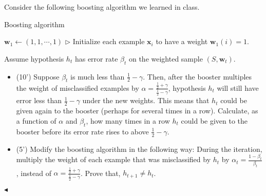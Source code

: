 \documentclass[11pt]{article}
\newenvironment{problem}[2][Problem]{\begin{trivlist}
\item[\hskip \labelsep {\bfseries #1}\hskip \labelsep {\bfseries #2.}]}{\hfill$\blacktriangleleft$\end{trivlist}}
\begin{document}
\begin{problem}{2 (15')} 
Consider the following boosting algorithm we learned in class. 

\begin{algorithm}[H]
    \caption{Boosting algorithm}

    $\bm w_1\gets (1,1,\cdots,1)$ \hfill{$\triangleright$ Initialize each example $\bm x_i$ to have a weight $\bm w_{1}(i)=1$.}


\end{algorithm}

Assume hypothesis $h_t$ has error rate $\beta_t$ on the weighted sample $(S,\bm w_t)$.
\begin{itemize}
    \item [(1)] (10') Suppose $\beta_t$ is much less than $\frac12-\gamma$. Then, after the booster multiples the weight of misclassified examples by $\alpha=\frac{\frac{1}{2}+\gamma}{\frac{1}{2}-\gamma}$, hypothesis $h_t$ will still have error less than $\frac12-\gamma$ under the new weights. This means that $h_t$ could be given again to the booster (perhaps for several times in a row). Calculate, as a function of $\alpha$ and $\beta_t$, how many times in a row $h_t$ could be given to the booster before its error rate rises to above $\frac12-\gamma$. 
    \item [(2)] (5') Modify the boosting algorithm in the following way: During the iteration, multiply the weight of each example that was misclassified by $h_t$ by $\alpha_t=\frac{1-\beta_t}{\beta_t}$, instead of $\alpha=\frac{\frac{1}{2}+\gamma}{\frac{1}{2}-\gamma}$. Prove that, $h_{t+1}\ne h_t$.
\end{itemize}
\end{problem}
\end{document}
